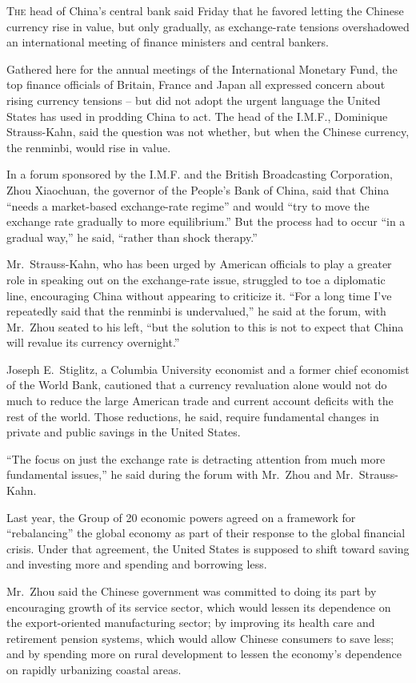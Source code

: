 ﻿\documentclass[12pt]{article}
\begin{document}
\lettrine{T}{he} head of China's central bank said Friday that he favored
letting the Chinese currency rise in value, but only gradually, as exchange-rate tensions
overshadowed an international meeting of finance ministers and central bankers.

Gathered here for the annual meetings of the International Monetary Fund, the top finance officials
of Britain, France and Japan all expressed concern about rising currency tensions -- but did not
adopt the urgent language the United States has used in prodding China to act. The head of the
I.M.F., Dominique Strauss-Kahn, said the question was not whether, but when the Chinese currency,
the renminbi, would rise in value.

In a forum sponsored by the I.M.F. and the British Broadcasting Corporation, Zhou Xiaochuan, the
governor of the People's Bank of China, said that China ``needs a market-based exchange-rate
regime'' and would ``try to move the exchange rate gradually to more equilibrium.'' But the process
had to occur ``in a gradual way,'' he said, ``rather than shock therapy.''

Mr.~Strauss-Kahn, who has been urged by American officials to play a greater role in speaking out on
the exchange-rate issue, struggled to toe a diplomatic line, encouraging China without appearing to
criticize it. ``For a long time I've repeatedly said that the renminbi is undervalued,'' he said at
the forum, with Mr.~Zhou seated to his left, ``but the solution to this is not to expect that China
will revalue its currency overnight.''

Joseph E.~Stiglitz, a Columbia University economist and a former chief economist of the World Bank,
cautioned that a currency revaluation alone would not do much to reduce the large American trade and
current account deficits with the rest of the world. Those reductions, he said, require fundamental
changes in private and public savings in the United States.

``The focus on just the exchange rate is detracting attention from much more fundamental issues,''
he said during the forum with Mr.~Zhou and Mr.~Strauss-Kahn.

Last year, the Group of 20 economic powers agreed on a framework for ``rebalancing'' the global
economy as part of their response to the global financial crisis. Under that agreement, the United
States is supposed to shift toward saving and investing more and spending and borrowing less.

Mr.~Zhou said the Chinese government was committed to doing its part by encouraging growth of its
service sector, which would lessen its dependence on the export-oriented manufacturing sector; by
improving its health care and retirement pension systems, which would allow Chinese consumers to
save less; and by spending more on rural development to lessen the economy's dependence on rapidly
urbanizing coastal areas.
\end{document}
